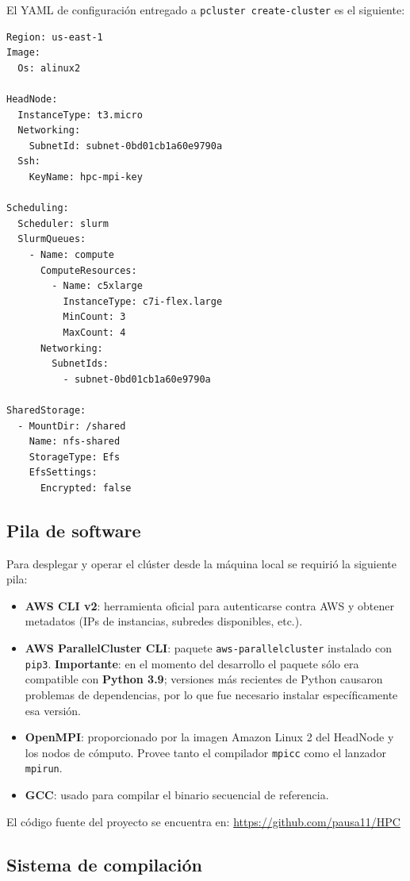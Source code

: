 \documentclass{article}
\begin{document}
El YAML de configuración entregado a \texttt{pcluster create-cluster} es el siguiente:

\begin{verbatim}
Region: us-east-1
Image:
  Os: alinux2

HeadNode:
  InstanceType: t3.micro
  Networking:
    SubnetId: subnet-0bd01cb1a60e9790a
  Ssh:
    KeyName: hpc-mpi-key

Scheduling:
  Scheduler: slurm
  SlurmQueues:
    - Name: compute
      ComputeResources:
        - Name: c5xlarge
          InstanceType: c7i-flex.large
          MinCount: 3
          MaxCount: 4
      Networking:
        SubnetIds:
          - subnet-0bd01cb1a60e9790a

SharedStorage:
  - MountDir: /shared
    Name: nfs-shared
    StorageType: Efs
    EfsSettings:
      Encrypted: false
\end{verbatim}

\subsection{Pila de software}

Para desplegar y operar el clúster desde la máquina local se requirió la siguiente pila:

\begin{itemize}
    \item \textbf{AWS CLI v2}: herramienta oficial para autenticarse contra AWS y obtener metadatos (IPs de instancias, subredes disponibles, etc.).
    \item \textbf{AWS ParallelCluster CLI}: paquete \texttt{aws-parallelcluster} instalado con \texttt{pip3}. \textbf{Importante}: en el momento del desarrollo el paquete sólo era compatible con \textbf{Python 3.9}; versiones más recientes de Python causaron problemas de dependencias, por lo que fue necesario instalar específicamente esa versión.
    \item \textbf{OpenMPI}: proporcionado por la imagen Amazon Linux 2 del HeadNode y los nodos de cómputo. Provee tanto el compilador \texttt{mpicc} como el lanzador \texttt{mpirun}.
    \item \textbf{GCC}: usado para compilar el binario secuencial de referencia.
\end{itemize}

El código fuente del proyecto se encuentra en: \url{https://github.com/pausa11/HPC}

\subsection{Sistema de compilación}
\end{document}
